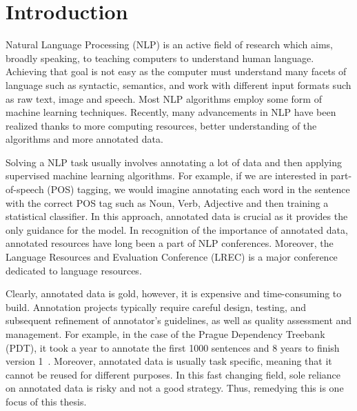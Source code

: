 \documentclass[12pt,twoside,final,hidelinks]{ltthesis}
\theoremstyle{definition}
\begin{document}


\hsp




\chapter{Introduction}
\label{chap:introduction}
Natural Language Processing (NLP) is an active field of research which aims, broadly speaking, to teaching computers to understand human language. Achieving that goal is not easy as the computer must understand many facets of language such as syntactic, semantics, and work with different input formats such as raw text, image and speech. Most NLP algorithms employ some form of machine learning techniques. Recently, many advancements in NLP have been realized thanks to more computing resources, better understanding of the algorithms and more annotated data. 

Solving a NLP task usually involves annotating a lot of data and then applying supervised machine learning algorithms. For example, if we are interested in part-of-speech (POS) tagging, we would imagine annotating each word in the sentence with the correct POS tag such as Noun, Verb, Adjective and then training a statistical classifier. In this approach, annotated data is crucial as it provides the only guidance for the model. In recognition of the importance of annotated data, annotated resources have long been a part of NLP conferences. Moreover, the Language Resources and Evaluation Conference (LREC) is a major conference dedicated to language resources. 

Clearly, annotated data is gold, however, it is expensive and time-consuming to build. Annotation projects typically require careful design, testing, and subsequent refinement of annotator's guidelines, as well as quality assessment and management. For example, in the case of the Prague Dependency Treebank (PDT), it took a year to annotate the first 1000 sentences and 8 years to finish version 1~\cite{bohmovahhh:2001}. Moreover, annotated data is 
usually task specific, meaning that it cannot be reused for different purposes. In this fast changing field, sole reliance on annotated data is risky and not a good strategy. Thus, remedying this is one focus of this thesis. 
\end{document}
